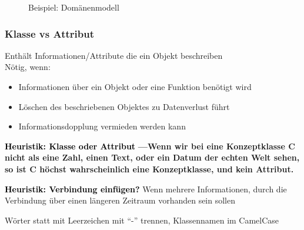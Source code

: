 \documentclass[ngerman]{tuda_summary}
\begin{document}
\begin{figure}[ht]
    \centering
    \caption{Beispiel: Domänenmodell}
    \label{fig:domain}
\end{figure}
\clearpage
\subsubsection{Klasse vs Attribut}
\begin{definition}
    Enthält Informationen/Attribute die ein Objekt beschreiben\\
    Nötig, wenn:\begin{itemize}
        \item Informationen über ein Objekt oder eine Funktion benötigt wird
        \item Löschen des beschriebenen Objektes zu Datenverlust führt
        \item Informationsdopplung vermieden werden kann
    \end{itemize}
\end{definition}
\begin{defBox}
    \small\textcolor{black}{\sffamily\bfseries Heuristik: Klasse oder Attribut} \space\sffamily\bfseries\color{black}---\normalfont\normalsize\space Wenn wir bei eine Konzeptklasse C nicht als eine Zahl, einen Text, oder ein Datum der echten Welt sehen, so ist C höchst wahrscheinlich eine Konzeptklasse, und kein Attribut.
\end{defBox}
\begin{defBox}
    \small\textcolor{black}{\sffamily\bfseries Heuristik: Verbindung einfügen?} Wenn mehrere Informationen, durch die Verbindung über einen längeren Zeitraum vorhanden sein sollen
\end{defBox}
\begin{definition}
    Wörter statt mit Leerzeichen mit "`-"' trennen, Klassennamen im CamelCase
\end{definition}
\end{document}

